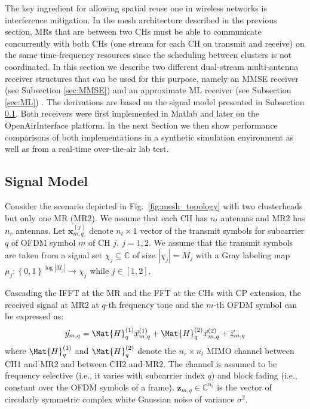 \documentclass[a4paper,twocolumn,journal]{IEEEtran}
\begin{document}
The key ingredient for allowing spatial reuse one in wireless networks is interference mitigation. In the mesh architecture described in the previous section, MRs that are between two CHs must be able to communicate concurrently with both CHs (one stream for each CH on transmit and receive) on the same  time-frequency resources since the scheduling between clusters is not coordinated. In this section we describe two different dual-stream multi-antenna receiver structures that can be used for this purpose, namely an MMSE receiver (see Subsection \ref{sec:MMSE}) and an approximate ML receiver (see Subsection \ref{sec:ML}) \cite{ghaffar08b,ghaffar08c}. The derivations are based on the signal model presented in Subsection \ref{sec:signal_model}. Both receivers were first implemented in Matlab and later on the OpenAirInterface platform. In the next Section we then show performance comparisons of both implementations in a synthetic simulation environment as well as from a real-time over-the-air lab test.

\subsection{Signal Model}
\label{sec:signal_model}

Consider the scenario depicted in Fig.\ \ref{fig:mesh_topology} with two clusterheads but only one MR (MR2). We assume that each CH has $n_{t}$ antennas and MR2 has $n_{r}$ antennas. Let $\textbf{x}^{(j)}_{m,q}$ denote $n_{t} \times 1$ vector of the transmit symbols for subcarrier $q$ of OFDM symbol $m$ of CH $j,~j=1,2$. We assume that the transmit symbols are taken from a signal set $\chi_{j}\subseteq\mathbb{C}$ of size $\left|\chi_{j}\right|=M_{j}$ with a Gray labeling map $\mu_{j}:\left\{0,1\right\}^{\log\left|M_{j}\right|}\rightarrow \chi_{j}$ while $j\in\left[1,2\right]$.

Cascading the IFFT at the MR and the FFT at the CHs with CP extension, the received signal at MR2 at $q$-th frequency tone and the $m$-th OFDM symbol can be expressed as:
\begin{equation}
\label{eqn:sys_model}
\Vec{y}_{m,q} = \Mat{H}^{(1)}_q \Vec{x}^{(1)}_{m,q} + \Mat{H}^{(2)}_q \Vec{x}^{(2)}_{m,q} + \Vec{z}_{m,q}
\end{equation} 
where $\Mat{H}^{(1)}_q$ and $\Mat{H}^{(2)}_q$ denote the $n_{r} \times n_{t}$ MIMO channel between CH1 and MR2 and between CH2 and MR2. The channel is assumed to be frequency selective (i.e., it varies with subcarrier index $q$) and block fading (i.e., constant over the OFDM symbols of a frame). $\textbf{z}_{m,q}\in\mathbb{C}^{n_{r}}$ is the vector of circularly symmetric complex white Gaussian noise of variance $\sigma^2$.
\end{document}
